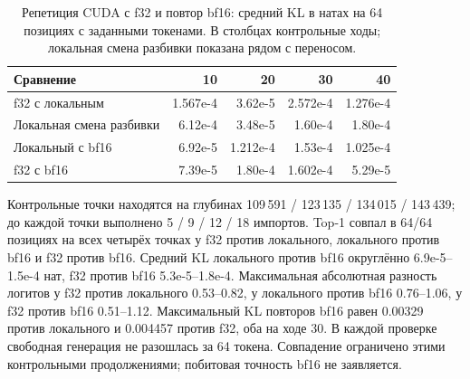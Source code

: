 \begin{table}[t]
\centering
\caption{Репетиция CUDA с f32 и повтор bf16: средний KL в натах на 64 позициях с заданными токенами.
В столбцах контрольные ходы; локальная смена разбивки показана рядом с переносом.}
\label{tab:bf16-growing-kl}
\footnotesize
\begin{tabular}{lrrrr}
\toprule
Сравнение & 10 & 20 & 30 & 40 \\
\midrule
f32 с локальным & 1.567e-4 & 3.62e-5 & 2.572e-4 & 1.276e-4 \\
Локальная смена разбивки & 6.12e-4 & 3.48e-5 & 1.60e-4 & 1.80e-4 \\
Локальный с bf16 & 6.92e-5 & 1.212e-4 & 1.53e-4 & 1.025e-4 \\
f32 с bf16 & 7.39e-5 & 1.80e-4 & 1.602e-4 & 5.29e-5 \\
\bottomrule
\end{tabular}
\end{table}

Контрольные точки находятся на глубинах 109\,591 / 123\,135 / 134\,015 / 143\,439;
до каждой точки выполнено 5 / 9 / 12 / 18 импортов.
Top-1 совпал в 64/64 позициях на всех четырёх точках у f32 против локального, локального против bf16 и f32 против bf16.
Средний KL локального против bf16 округлённо 6.9e-5--1.5e-4 нат, f32 против bf16 5.3e-5--1.8e-4.
Максимальная абсолютная разность логитов у f32 против локального 0.53--0.82,
у локального против bf16 0.76--1.06, у f32 против bf16 0.51--1.12.
Максимальный KL повторов bf16 равен 0.00329 против локального и 0.004457 против f32, оба на ходе 30.
В каждой проверке свободная генерация не разошлась за 64 токена.
Совпадение ограничено этими контрольными продолжениями; побитовая точность bf16 не заявляется.

